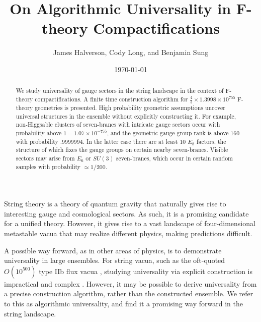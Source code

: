 \documentclass[aps,prl,twocolumn, superscriptaddress,groupedaddress,nofootinbib]{revtex4-1}
\begin{document}
\title{On Algorithmic Universality in F-theory Compactifications}
\author{James Halverson, Cody Long, and Benjamin Sung}

\date{\today}

\begin{abstract}
We study universality of gauge sectors in the string landscape
in the context of F-theory compactifications.
A finite time construction algorithm for $\frac43 \times 1.3998 \times 10^{755}$ F-theory geometries is presented. High probability geometric
assumptions uncover universal structures in the ensemble without
explicitly constructing it. For example, non-Higgsable clusters
of seven-branes with intricate gauge sectors occur with
probability above $1-1.07\times 10^{-755}$,  and
the geometric gauge group rank is above $160$ with probability
$.9999994$. In the latter case there are at least $10$ $E_8$
factors, the structure of which fixes the gauge groups
on certain nearby seven-branes. Visible sectors may arise from $E_6$ or $SU(3)$ seven-branes, which occur
in certain random samples with probability $\simeq 1/200$.
\end{abstract}

\maketitle


String theory is a theory of quantum gravity that naturally
gives rise to interesting gauge and cosmological sectors. As
such, it is a promising candidate for a unified theory. However, it gives
rise to a vast landscape of four-dimensional metastable vacua that
may realize different physics, making predictions difficult.


A possible way forward, as in other areas of physics, is to demonstrate
universality in large ensembles. For string vacua, such as the oft-quoted
$O(10^{500})$ type IIb flux vacua
\cite{Bousso:2000xa,*Ashok:2003gk,*Denef:2004ze}, studying universality via
explicit construction is impractical and complex
\cite{Denef:2006ad,*Cvetic:2010ky}. However, it may be possible to derive
universality from a precise construction algorithm, rather than the
constructed ensemble. We refer to this as algorithmic universality, and find it a
promising way forward in the string landscape.

\end{document}
